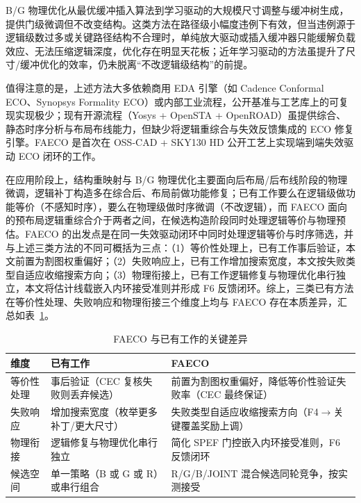 \documentclass[journal]{IEEEtran}
\begin{document}
B/G 物理优化从最优缓冲插入算法\cite{liang2012buffer}到学习驱动的大规模尺寸调整与缓冲树生成\cite{liu2021rlsizer,huang2025phys,chen2024aito,zhang2025buffalo}，提供门级微调但不改变结构。这类方法在路径级小幅度违例下有效，但当违例源于逻辑级数过多或关键路径结构不合理时，单纯放大驱动或插入缓冲器只能缓解负载效应、无法压缩逻辑深度，优化存在明显天花板\cite{liu2021rlsizer,huang2025phys}；近年学习驱动的方法\cite{chen2024aito,zhang2025buffalo}虽提升了尺寸/缓冲优化的效率，仍未脱离“不改逻辑级结构”的前提。

值得注意的是，上述方法大多依赖商用 EDA 引擎（如 Cadence Conformal ECO、Synopsys Formality ECO）或内部工业流程，公开基准与工艺库上的可复现实现极少；现有开源流程（Yosys + OpenSTA + OpenROAD）虽提供综合、静态时序分析与布局布线能力，但缺少将逻辑重综合与失效反馈集成的 ECO 修复引擎。FAECO 是首次在 OSS-CAD + SKY130 HD 公开工艺上实现端到端失效驱动 ECO 闭环的工作。

在应用阶段上，结构重映射与 B/G 物理优化主要面向后布局/后布线阶段的物理微调，逻辑补丁构造多在综合后、布局前做功能修复；已有工作要么在逻辑级做功能等价（不感知时序），要么在物理级做时序微调（不改逻辑），而 FAECO 面向的预布局逻辑重综合介于两者之间，在候选构造阶段同时处理逻辑等价与物理预估。FAECO 的出发点是在同一失效驱动闭环中同时处理逻辑等价与时序筛选，并与上述三类方法的不同可概括为三点：（1）等价性处理上，已有工作事后验证，本文前置为割图权重偏好；（2）失败响应上，已有工作增加搜索宽度，本文按失败类型自适应收缩搜索方向；（3）物理衔接上，已有工作逻辑修复与物理优化串行独立，本文将估计线载嵌入内环接受准则并形成 F6 反馈闭环。综上，三类已有方法在等价性处理、失败响应和物理衔接三个维度上均与 FAECO 存在本质差异，汇总如表~\ref{tab:related_diff}。

\begin{table}[!t]
\centering
\caption{FAECO 与已有工作的关键差异}
\label{tab:related_diff}
\footnotesize
\setlength{\tabcolsep}{3pt}
\begin{tabular}{p{2.2cm}p{2.8cm}p{3.2cm}}
\toprule
\textbf{维度} & \textbf{已有工作} & \textbf{FAECO} \\
\midrule
等价性处理 & 事后验证（CEC 复核失败则丢弃候选） & 前置为割图权重偏好，降低等价性验证失败率（CEC 最终保证） \\
失败响应 & 增加搜索宽度（枚举更多补丁/更大尺寸） & 失败类型自适应收缩搜索方向（F4$\to$关键覆盖奖励上调） \\
物理衔接 & 逻辑修复与物理优化串行独立 & 简化 SPEF 门控嵌入内环接受准则，F6 反馈闭环 \\
候选空间 & 单一策略（B 或 G 或 R）或串行组合 & R/G/B/JOINT 混合候选同轮竞争，按实测接受 \\
\bottomrule
\end{tabular}
\end{table}
\end{document}
